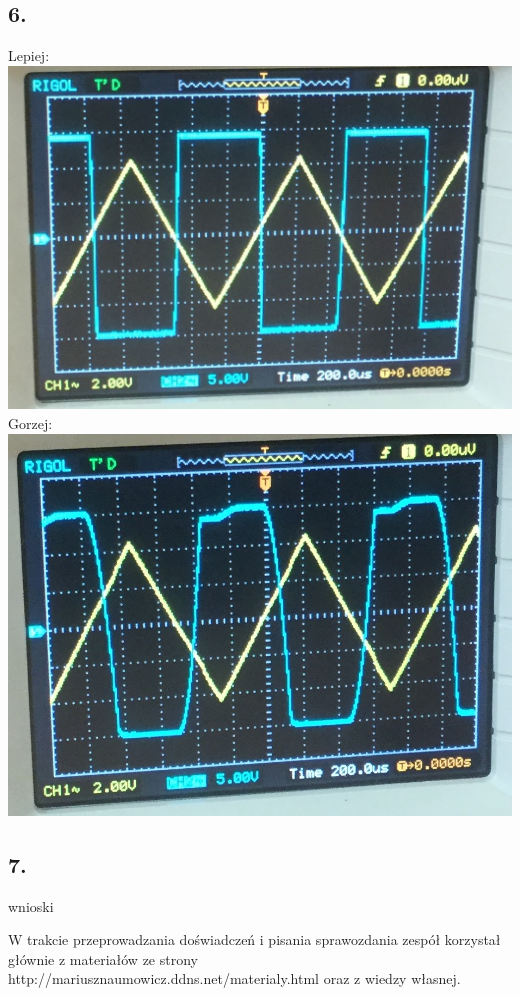 \documentclass[polish,a4paper]{article}
\begin{document}
\subsection*{6.}
Lepiej: \includegraphics[scale=0.5]{przebieg_prostokatny}
Gorzej: \includegraphics[scale=0.5]{gorzej}
\subsection*{7.}
wnioski




\begin{thebibliography}{9}

  W trakcie przeprowadzania doświadczeń i pisania sprawozdania zespół korzystał głównie z materiałów ze strony http://mariusznaumowicz.ddns.net/materialy.html oraz z wiedzy własnej.\\


\end{thebibliography}
\end{document}
